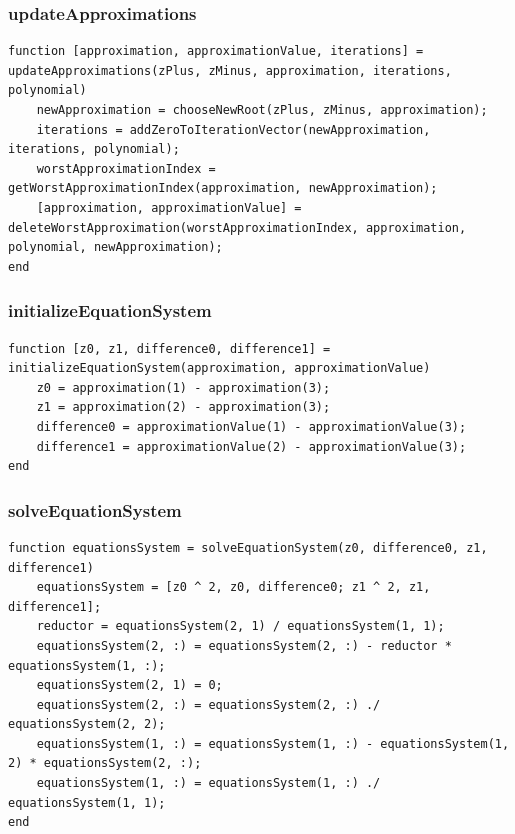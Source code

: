 \subsubsection{updateApproximations}
\begin{simplechar}
\begin{lstlisting}
function [approximation, approximationValue, iterations] = updateApproximations(zPlus, zMinus, approximation, iterations, polynomial)
    newApproximation = chooseNewRoot(zPlus, zMinus, approximation);
    iterations = addZeroToIterationVector(newApproximation, iterations, polynomial);
    worstApproximationIndex = getWorstApproximationIndex(approximation, newApproximation);
    [approximation, approximationValue] = deleteWorstApproximation(worstApproximationIndex, approximation, polynomial, newApproximation);
end
\end{lstlisting}
\end{simplechar}

\subsubsection{initializeEquationSystem}
\begin{simplechar}
\begin{lstlisting}
function [z0, z1, difference0, difference1] = initializeEquationSystem(approximation, approximationValue)
    z0 = approximation(1) - approximation(3);
    z1 = approximation(2) - approximation(3);
    difference0 = approximationValue(1) - approximationValue(3);
    difference1 = approximationValue(2) - approximationValue(3);
end
\end{lstlisting}
\end{simplechar}

\subsubsection{solveEquationSystem}
\begin{simplechar}
\begin{lstlisting}
function equationsSystem = solveEquationSystem(z0, difference0, z1, difference1)
    equationsSystem = [z0 ^ 2, z0, difference0; z1 ^ 2, z1, difference1];
    reductor = equationsSystem(2, 1) / equationsSystem(1, 1);
    equationsSystem(2, :) = equationsSystem(2, :) - reductor * equationsSystem(1, :);
    equationsSystem(2, 1) = 0;
    equationsSystem(2, :) = equationsSystem(2, :) ./ equationsSystem(2, 2);
    equationsSystem(1, :) = equationsSystem(1, :) - equationsSystem(1, 2) * equationsSystem(2, :);
    equationsSystem(1, :) = equationsSystem(1, :) ./ equationsSystem(1, 1);
end
\end{lstlisting}
\end{simplechar}

